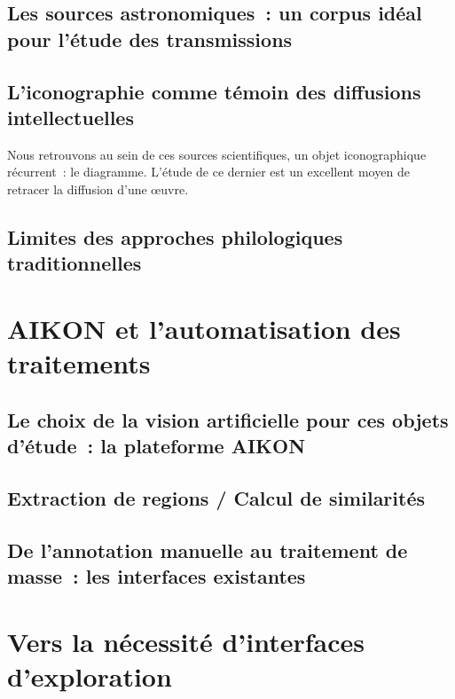 \documentclass[a4paper,12pt,twoside]{book}
\newcommand{\clearemptydoublepage}{\newpage{\pagestyle{empty}\cleardoublepage}}
\begin{document}
	\section[Un corpus idéal pour l'étude des transmissions]{Les sources astronomiques~: un corpus idéal pour l'étude des transmissions}
	

	\section[L'iconographie témoin des diffusions intellectuelles]{L'iconographie comme témoin des diffusions intellectuelles}

	Nous retrouvons au sein de ces sources scientifiques, un objet iconographique récurrent~: le diagramme. L'étude de ce dernier est un excellent moyen de retracer la diffusion d'une œuvre.
	

	\section{Limites des approches philologiques traditionnelles}
	

	\clearemptydoublepage

	\chapter{AIKON et l'automatisation des traitements}
	\section{Le choix de la vision artificielle pour ces objets d'étude~: la plateforme AIKON}

	\section{Extraction de regions / Calcul de similarités}

	\section{De l'annotation manuelle au traitement de masse~: les interfaces existantes}

	\clearemptydoublepage

	\chapter{Vers la nécessité d'interfaces d'exploration}
\end{document}
